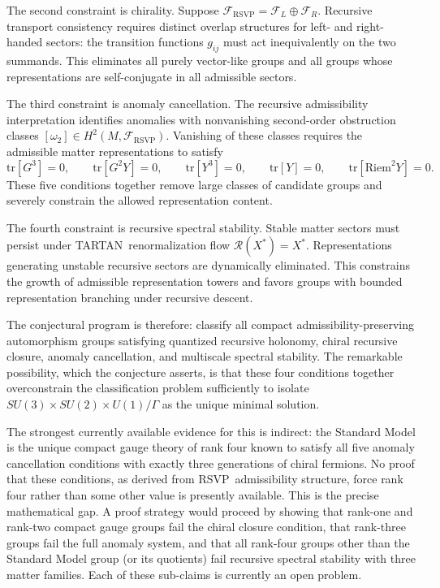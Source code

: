 \documentclass[12pt,a4paper]{article}
\newcommand{\RSVP}{\textrm{RSVP}}
\newcommand{\TARTAN}{\textrm{TARTAN}}
\newcommand{\Sheaf}{\mathcal{F}}
\begin{document}
The second constraint is chirality. Suppose $\Sheaf_\RSVP=\Sheaf_L\oplus\Sheaf_R$.
Recursive transport consistency requires distinct overlap structures for left-
and right-handed sectors: the transition functions $g_{ij}$ must act
inequivalently on the two summands. This eliminates all purely vector-like
groups and all groups whose representations are self-conjugate in all
admissible sectors.

The third constraint is anomaly cancellation. The recursive admissibility
interpretation identifies anomalies with nonvanishing second-order obstruction
classes $[\omega_2]\in H^2(M,\Sheaf_\RSVP)$. Vanishing of these classes
requires the admissible matter representations to satisfy
\[
\mathrm{tr}[G^3]=0,\qquad
\mathrm{tr}[G^2Y]=0,\qquad
\mathrm{tr}[Y^3]=0,\qquad
\mathrm{tr}[Y]=0,\qquad
\mathrm{tr}[\mathrm{Riem}^2 Y]=0.
\]
These five conditions together remove large classes of candidate groups and
severely constrain the allowed representation content.

The fourth constraint is recursive spectral stability. Stable matter sectors
must persist under \TARTAN\ renormalization flow $\mathcal{R}(X^\ast)=X^\ast$.
Representations generating unstable recursive sectors are dynamically
eliminated. This constrains the growth of admissible representation towers and
favors groups with bounded representation branching under recursive descent.

The conjectural program is therefore: classify all compact admissibility-preserving
automorphism groups satisfying quantized recursive holonomy, chiral recursive
closure, anomaly cancellation, and multiscale spectral stability. The remarkable
possibility, which the conjecture asserts, is that these four conditions
together overconstrain the classification problem sufficiently to isolate
$SU(3)\times SU(2)\times U(1)/\Gamma$ as the unique minimal solution.

The strongest currently available evidence for this is indirect: the Standard
Model is the unique compact gauge theory of rank four known to satisfy all five
anomaly cancellation conditions with exactly three generations of chiral
fermions. No proof that these conditions, as derived from \RSVP\ admissibility
structure, force rank four rather than some other value is presently available.
This is the precise mathematical gap. A proof strategy would proceed by showing
that rank-one and rank-two compact gauge groups fail the chiral closure
condition, that rank-three groups fail the full anomaly system, and that all
rank-four groups other than the Standard Model group (or its quotients) fail
recursive spectral stability with three matter families. Each of these sub-claims
is currently an open problem.
\end{document}
